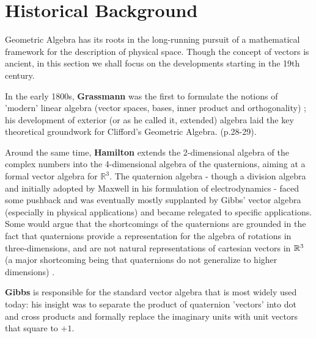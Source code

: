 \section{Historical Background}
Geometric Algebra has its roots in the long-running pursuit of a mathematical framework for the description of physical space. Though the concept of vectors is ancient, in this section we shall focus on the developments starting in the 19th century.

In the early 1800s, \textbf{Grassmann} was the first to formulate the notions of 'modern' linear algebra (vector spaces, bases, inner product and orthogonality) \cite{grassmann}; his development of exterior (or as he called it, extended) algebra laid the key theoretical groundwork for Clifford's Geometric Algebra. (p.28-29)\cite{ga-foundations}.

Around the same time, \textbf{Hamilton} extends the 2-dimensional algebra of the complex numbers into the 4-dimensional algebra of the quaternions, aiming at a formal vector algebra for $\mathbb{R}^3$.
The quaternion algebra - though a division algebra and initially adopted by Maxwell in his formulation of electrodynamics - faced some pushback and was eventually mostly supplanted by Gibbs' vector algebra (especially in physical applications) and became relegated to specific applications. Some would argue that the shortcomings of the quaternions are grounded in the fact that quaternions provide a representation for the algebra of rotations in three-dimensions, and are not natural representations of cartesian vectors in $\mathbb{R}^3$ (a major shortcoming being that quaternions do not generalize to higher dimensions) \cite{ga-history}.

\textbf{Gibbs} is responsible for the standard vector algebra that is most widely used today: his insight was to separate the product of quaternion 'vectors' into dot and cross products and formally replace the imaginary units with unit vectors that square to $+1$.

